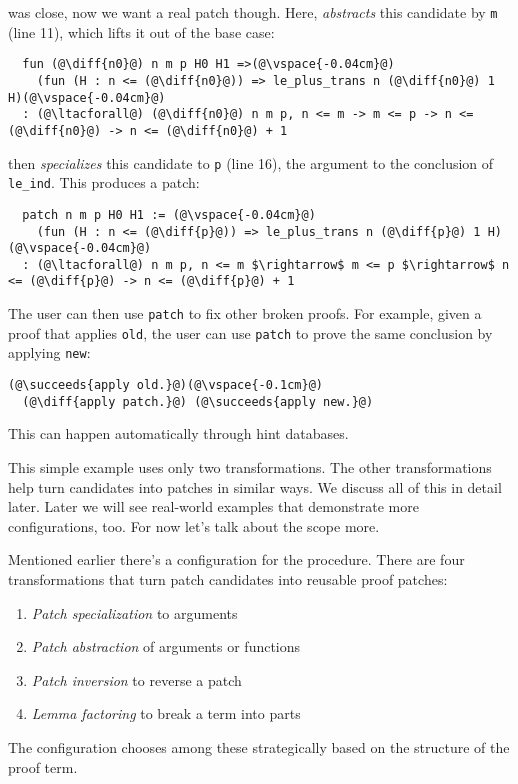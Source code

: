 was close, now we want a real patch though.
Here, \sysname \textit{abstracts} this candidate by \lstinline{m} (line 11), which lifts it out of the base case:

\begin{lstlisting}
  fun (@\diff{n0}@) n m p H0 H1 =>(@\vspace{-0.04cm}@)
    (fun (H : n <= (@\diff{n0}@)) => le_plus_trans n (@\diff{n0}@) 1 H)(@\vspace{-0.04cm}@)
  : (@\ltacforall@) (@\diff{n0}@) n m p, n <= m -> m <= p -> n <= (@\diff{n0}@) -> n <= (@\diff{n0}@) + 1
\end{lstlisting}
\sysname then \textit{specializes} this candidate to \lstinline{p} (line 16), the argument
to the conclusion of \lstinline{le_ind}. This produces a patch:

\begin{lstlisting}
  patch n m p H0 H1 := (@\vspace{-0.04cm}@)
    (fun (H : n <= (@\diff{p}@)) => le_plus_trans n (@\diff{p}@) 1 H)(@\vspace{-0.04cm}@)
  : (@\ltacforall@) n m p, n <= m $\rightarrow$ m <= p $\rightarrow$ n <= (@\diff{p}@) -> n <= (@\diff{p}@) + 1
\end{lstlisting}
The user can then use \lstinline{patch} to fix other broken proofs.
For example, given a proof that applies \lstinline{old}, the user can use \lstinline{patch} to prove the same conclusion
by applying \lstinline{new}:

\begin{lstlisting}[language=coq]
  (@\succeeds{apply old.}@)(@\vspace{-0.1cm}@)
  (@\diff{apply patch.}@) (@\succeeds{apply new.}@)
\end{lstlisting}
This can happen automatically through hint databases.

This simple example uses only two transformations. The other transformations help turn candidates
into patches in similar ways. We discuss all of this in detail later.
Later we will see real-world examples that demonstrate more configurations, too.
For now let's talk about the scope more.

Mentioned earlier there's a configuration for the procedure.
There are four transformations that turn patch candidates into reusable proof patches:

\begin{enumerate}
\item \textit{Patch specialization} to arguments
\item \textit{Patch abstraction} of arguments or functions
\item \textit{Patch inversion} to reverse a patch
\item \textit{Lemma factoring} to break a term into parts
\end{enumerate}
The configuration chooses among these strategically based on the structure of the proof term.

